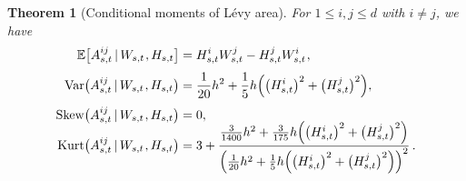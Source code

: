 \documentclass[sn-mathphys-num]{sn-jnl}%
\newtheorem{theorem}{Theorem}%
\newcommand{\E}{\mathbb{E}}
\newcommand{\m}{\hspace{0.25mm}}
\newcommand{\var}{\mathrm{Var}}
\begin{document}
\begin{theorem}[Conditional moments of L\'{e}vy area]\label{thm:levy_area_moments1}
For $1\leq i, j\leq d$ with $i\neq j$, we have
\begin{align}
\E\big[A_{s,t}^{ij}\,|\, W_{s,t}\m, H_{s,t}\big] & = H_{s,t}^i W_{s,t}^j - H_{s,t}^j W_{s,t}^i\m,\label{eq:levy_area_cond_exp}\\[3pt]
\var\big(A_{s,t}^{ij} \,|\, W_{s,t}\m, H_{s,t}\big) & = \frac{1}{20} h^2 + \frac{1}{5}h\Big(\big(H_{s,t}^i\big)^2 + \big(H_{s,t}^j\big)^2\Big)\label{eq:levy_area_cond_var},\\[3pt]
\mathrm{Skew}\big(A_{s,t}^{ij} \,|\, W_{s,t}\m, H_{s,t}\big) & = 0\label{eq:levy_area_cond_skew},\\[-6pt]
\mathrm{Kurt}\big(A_{s,t}^{ij} \,|\, W_{s,t}\m, H_{s,t}\big) & = 3 + \frac{\frac{3}{1400}h^2 + \frac{3}{175}h\Big(\big(H_{s,t}^i\big)^2 + \big(H_{s,t}^j\big)^2\Big)}{\Big(\frac{1}{20} h^2 + \frac{1}{5}h\Big(\big(H_{s,t}^i\big)^2 + \big(H_{s,t}^j\big)^2\Big)\Big)^2}\,.\label{eq:levy_area_cond_kurt}
\end{align}
\end{theorem}
\end{document}
